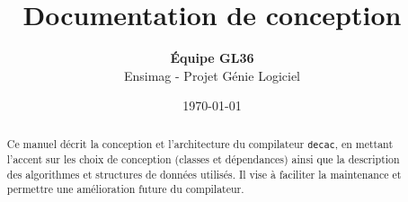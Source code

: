 \documentclass[12pt,a4paper]{article}
\title{
    \vspace{2cm}
    \textbf{\Huge Documentation de conception}\\
}
\author{
    \textbf{Équipe GL36} \\
    Ensimag - Projet Génie Logiciel
}
\date{\today}
\begin{document}
\maketitle

\begin{abstract}
\begin{center}
Ce manuel décrit la conception et l'architecture du compilateur \texttt{decac}, en mettant l'accent sur les choix de conception (classes et dépendances) ainsi que la description des algorithmes et structures de données utilisés. Il vise à faciliter la maintenance et permettre une amélioration future du compilateur.
\end{center}
\end{abstract}

\tableofcontents
\newpage



\end{document}
